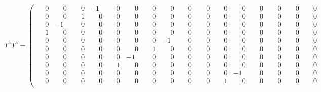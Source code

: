 \documentclass[10pt]{article}
\begin{document}
\[
T^{4}T^{5} = \left(\begin{smallmatrix}
\phantom{-}0 & \phantom{-}0 & \phantom{-}0 & -1 & \phantom{-}0 & \phantom{-}0 & \phantom{-}0 & \phantom{-}0 & \phantom{-}0 & \phantom{-}0 & \phantom{-}0 & \phantom{-}0 & \phantom{-}0 & \phantom{-}0 & \phantom{-}0 & \phantom{-}0 \\
\phantom{-}0 & \phantom{-}0 & \phantom{-}1 & \phantom{-}0 & \phantom{-}0 & \phantom{-}0 & \phantom{-}0 & \phantom{-}0 & \phantom{-}0 & \phantom{-}0 & \phantom{-}0 & \phantom{-}0 & \phantom{-}0 & \phantom{-}0 & \phantom{-}0 & \phantom{-}0 \\
\phantom{-}0 & -1 & \phantom{-}0 & \phantom{-}0 & \phantom{-}0 & \phantom{-}0 & \phantom{-}0 & \phantom{-}0 & \phantom{-}0 & \phantom{-}0 & \phantom{-}0 & \phantom{-}0 & \phantom{-}0 & \phantom{-}0 & \phantom{-}0 & \phantom{-}0 \\
\phantom{-}1 & \phantom{-}0 & \phantom{-}0 & \phantom{-}0 & \phantom{-}0 & \phantom{-}0 & \phantom{-}0 & \phantom{-}0 & \phantom{-}0 & \phantom{-}0 & \phantom{-}0 & \phantom{-}0 & \phantom{-}0 & \phantom{-}0 & \phantom{-}0 & \phantom{-}0 \\
\phantom{-}0 & \phantom{-}0 & \phantom{-}0 & \phantom{-}0 & \phantom{-}0 & \phantom{-}0 & \phantom{-}0 & -1 & \phantom{-}0 & \phantom{-}0 & \phantom{-}0 & \phantom{-}0 & \phantom{-}0 & \phantom{-}0 & \phantom{-}0 & \phantom{-}0 \\
\phantom{-}0 & \phantom{-}0 & \phantom{-}0 & \phantom{-}0 & \phantom{-}0 & \phantom{-}0 & \phantom{-}1 & \phantom{-}0 & \phantom{-}0 & \phantom{-}0 & \phantom{-}0 & \phantom{-}0 & \phantom{-}0 & \phantom{-}0 & \phantom{-}0 & \phantom{-}0 \\
\phantom{-}0 & \phantom{-}0 & \phantom{-}0 & \phantom{-}0 & \phantom{-}0 & -1 & \phantom{-}0 & \phantom{-}0 & \phantom{-}0 & \phantom{-}0 & \phantom{-}0 & \phantom{-}0 & \phantom{-}0 & \phantom{-}0 & \phantom{-}0 & \phantom{-}0 \\
\phantom{-}0 & \phantom{-}0 & \phantom{-}0 & \phantom{-}0 & \phantom{-}1 & \phantom{-}0 & \phantom{-}0 & \phantom{-}0 & \phantom{-}0 & \phantom{-}0 & \phantom{-}0 & \phantom{-}0 & \phantom{-}0 & \phantom{-}0 & \phantom{-}0 & \phantom{-}0 \\
\phantom{-}0 & \phantom{-}0 & \phantom{-}0 & \phantom{-}0 & \phantom{-}0 & \phantom{-}0 & \phantom{-}0 & \phantom{-}0 & \phantom{-}0 & \phantom{-}0 & \phantom{-}0 & -1 & \phantom{-}0 & \phantom{-}0 & \phantom{-}0 & \phantom{-}0 \\
\phantom{-}0 & \phantom{-}0 & \phantom{-}0 & \phantom{-}0 & \phantom{-}0 & \phantom{-}0 & \phantom{-}0 & \phantom{-}0 & \phantom{-}0 & \phantom{-}0 & \phantom{-}1 & \phantom{-}0 & \phantom{-}0 & \phantom{-}0 & \phantom{-}0 & \phantom{-}0 \\

\end{smallmatrix}\]
\end{document}
